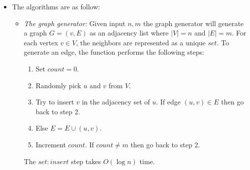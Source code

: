 \begin{itemize}
\begin{algorithm}
 \caption{Tick in Simulation}
\end{algorithm}

\item The algorithms are as follow:
\begin{itemize}
\setlength\itemsep{1em}
    \item{\textit{The graph generator:}}
    Given input $n,m$ the graph generator will generate a graph $G=(v,E)$ as an adjacency list where $|V| = n$ and $|E| = m$. For each vertex $v \in V$, the neighbors are represented as a unique $set$. To generate an edge, the function performs the following steps:
    \begin{enumerate}
        \item Set $count=0$.
        \item Randomly pick $u$ and $v$ from $V$.
        \item Try to insert $v$ in the adjacency set of $u$. If edge $(u,v) \in E$ then go back to step 2.
        \item Else $E = E\cup (u,v)$.
        \item Increment $count$. If $count \neq m$ then go back to step 2.
    \end{enumerate}
    The $set:insert$ step takes $O(\log{n})$ time.
    

\end{itemize}
\end{itemize}

